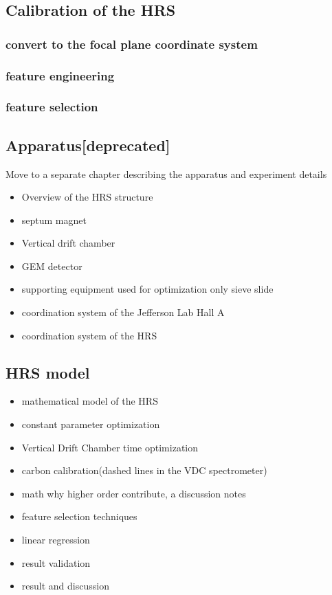 \subsection{Calibration of the HRS}

\subsubsection{convert to the focal plane coordinate system}


\subsubsection{feature engineering} 
\subsubsection{feature selection}
\subsection{Apparatus[deprecated]}

Move to a separate chapter describing the apparatus and experiment details

\begin{itemize}
    \item Overview of the HRS structure
    \item septum magnet 
    \item Vertical drift chamber 
    \item GEM detector
    \item supporting equipment used for optimization only sieve slide

    \item coordination system of the Jefferson Lab Hall A
    \item coordination system of the HRS
\end{itemize}


\subsection{HRS model}

\begin{itemize}
    \item mathematical model of the HRS
    \item constant parameter optimization
    \item Vertical Drift Chamber time optimization
    \item carbon calibration(dashed lines in the VDC spectrometer)
    \item math why higher order contribute, a discussion notes
    \item feature selection techniques
    \item linear regression
    \item result validation
    \item result and discussion
\end{itemize}

